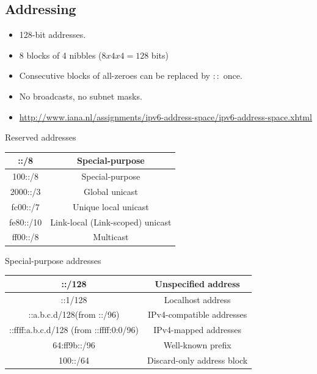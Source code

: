 \documentclass{article}
\begin{document}
\subsection{Addressing}

\begin{itemize}
	\item 128-bit addresses.
	\item 8 blocks of 4 nibbles ($8x4x4 = 128$ bits)
	\item Consecutive blocks of all-zeroes can be replaced by $::$ once.
	\item No broadcasts, no subnet masks.
	\item \url{http://www.iana.nl/assignments/ipv6-address-space/ipv6-address-space.xhtml}
\end{itemize}


\begin{description}
	\item[Reserved addresses]
\end{description}
	\begin{center}
	\begin{tabular}{ | c | c | }
		\hline
		::/8 & Special-purpose \\ \hline
		100::/8 & Special-purpose \\ \hline
		2000::/3 & Global unicast \\ \hline
		fc00::/7 & Unique local unicast \\ \hline
		fe80::/10 & Link-local (Link-scoped) unicast \\ \hline
		ff00::/8 & Multicast \\
		\hline
	\end{tabular}
	\end{center}

\begin{description}
	\item[Special-purpose addresses]
\end{description}
	\begin{center}
  	\begin{tabular}{ | c | c | }
    	\hline
		::/128 & Unspecified address \\ \hline
		::1/128 & Localhost address \\ \hline
		::a.b.c.d/128(from ::/96) & IPv4-compatible addresses \\ \hline
		::ffff:a.b.c.d/128 (from ::ffff:0:0/96) & IPv4-mapped addresses \\ \hline
		64:ff9b::/96 & Well-known prefix \\ \hline
		100::/64 & Discard-only address block \\
		\hline
	\end{tabular}
	\end{center}
	
\end{document}
